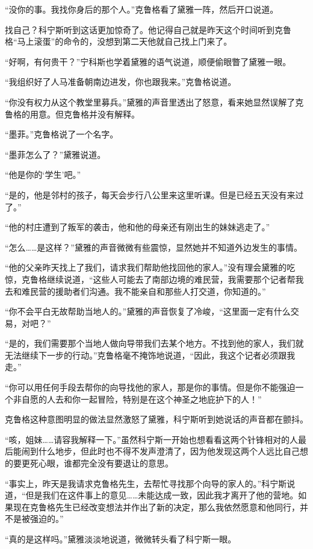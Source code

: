 “没你的事。我找你身后的那个人。”克鲁格看了黛雅一阵，然后开口说道。

找自己？科宁斯听到这话更加惊奇了。他记得自己就是昨天这个时间听到克鲁格“马上滚蛋”的命令的，没想到第二天他就自己找上门来了。

“好啊，有何贵干？”宁科斯也学着黛雅的语气说道，顺便偷眼瞥了黛雅一眼。

“我组织好了人马准备朝南边进发，你也跟我来。”克鲁格说道。

“你没有权力从这个教堂里募兵。”黛雅的声音里透出了怒意，看来她显然误解了克鲁格的用意。但克鲁格并没有解释。

“墨菲。”克鲁格说了一个名字。

“墨菲怎么了？”黛雅说道。

“他是你的‘学生’吧。”

“是的，他是邻村的孩子，每天会步行八公里来这里听课。但是已经五天没有来过了。”

“他的村庄遭到了叛军的袭击，他和他的母亲还有刚出生的妹妹逃走了。”

“怎么……是这样？”黛雅的声音微微有些震惊，显然她并不知道外边发生的事情。

“他的父亲昨天找上了我们，请求我们帮助他找回他的家人。”没有理会黛雅的吃惊，克鲁格继续说道，“这些人可能去了南部边境的难民营，我需要那个记者帮我去和难民营的援助者们沟通。我不能亲自和那些人打交道，你知道的。”

“你不会平白无故帮助当地人的。”黛雅的声音恢复了冷峻，“这里面一定有什么交易，对吧？”

“是的，我们需要那个当地人做向导带我们去某个地方。不找到他的家人，我们就无法继续下一步的行动。”克鲁格毫不掩饰地说道，“因此，我这个记者必须跟我走。”

“你可以用任何手段去帮你的向导找他的家人，那是你的事情。但是你不能强迫一个非自愿的人去和你一起冒险，特别是在这个神圣之地庇护下的人！”

克鲁格这种意图明显的做法显然激怒了黛雅，科宁斯听到她说话的声音都在颤抖。

“咳，姐妹……请容我解释一下。”虽然科宁斯一开始也想看看这两个针锋相对的人最后能闹到什么地步，但此时也不得不发声澄清了，因为他发现这两个人远比自己想的要更死心眼，谁都完全没有要退让的意思。

“事实上，昨天是我请求克鲁格先生，去帮忙寻找那个向导的家人的。”科宁斯说道，“但是我们在这件事上的意见……未能达成一致，因此我才离开了他的营地。如果现在克鲁格先生已经改变想法并作出了新的决定，那么我依然愿意和他同行，并不是被强迫的。”

“真的是这样吗。”黛雅淡淡地说道，微微转头看了科宁斯一眼。

